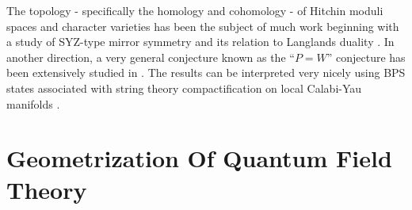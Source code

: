 \documentclass[12pt]{article}
\begin{document}
The topology - specifically the homology and cohomology - 
of Hitchin moduli spaces and character varieties has been the subject of much work beginning with a study of 
SYZ-type \cite{Strominger:1996it} mirror symmetry and its relation to Langlands duality \cite{Hausel:2002ap}. 
In another direction, a very general conjecture known as the ``$P=W$'' conjecture 
has been extensively studied in 
\cite{hausel2008mixed,HauselVillegas2011,
hausel2016arithmetic,
decataldo2011topology,decataldo2010exchange,
shen2018perverse,mauri2021geometric,szabo2019simpsons,
decataldo2021hitchin,decataldo2020pw,felisetti2022pw,
szabo2021pw,davison2021nonabelian}. The results can be 
interpreted very nicely  using  
BPS states associated with  string theory compactification on 
local Calabi-Yau manifolds 
\cite{Chuang:2012dv,Chuang:2013wpa,Diaconescu:2017tga,
Chuang:2018fks}. 




\section{Geometrization Of Quantum Field Theory}
\label{sec:GeoQFT}
\end{document}
